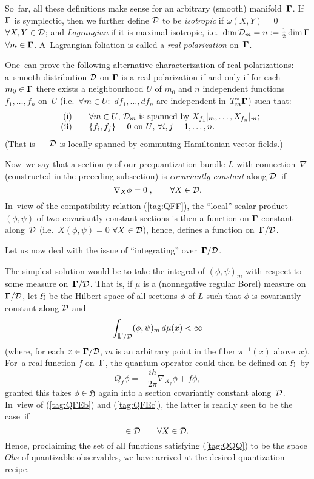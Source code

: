 \documentclass[11pt]{amsart}
\numberwithin{equation}{section}
\theoremstyle{remark}
\newcommand\Obs{Obs}
\newcommand\Omg{{\bigam}}   %
\newcommand\DD{{\Cal D}}
\newcommand\MD{{\Omg/\DD}}
\newcommand\HH{\mathfrak H}
\newcommand{\bigam}{\mbox{\boldmath $\Gamma$}}
\begin{document}
So~far, all these definitions make sense for an arbitrary (smooth)
manifold~$\Omg$. If~$\Omg$ is symplectic, then we further define $\DD$ to
be {\sl isotropic\/} if $\omega(X,Y)=0$ $\forall X,Y\in\DD$; and
{\sl Lagrangian\/} if it is maximal isotropic,
i.e.~$\dim\DD_m=n:=\frac12\dim \Omg$ $\forall m\in \Omg$.
A~Lagrangian foliation is called a {\sl real polarization\/} on~$\Omg$.

One~can prove the following alternative characterization of real polarizations:
a~smooth distribution $\DD$ on $\Omg$ is a real polarization if and only if for
each $m_0\in \Omg$ there exists a neighbourhood $U$ of $m_0$ and $n$
independent functions $f_1,\dots,f_n$ on~$U$ (i.e.~$\forall m\in U:$
$df_1,\dots,df_n$ are independent in~$T^*_m \Omg$) such that:
\begin{equation}  \begin{array}{rl}
\text{(i) }&\text{$\forall m\in U$, $\DD_m$ is spanned by $X_{f_1}|_m,\dots,
X_{f_n}|_m$;}\\
\text{(ii) }&\text{$\{f_i,f_j\}=0$ on $U$, $\forall i,j=1,\dots,n$.}
\end{array}  \label{tag:REALPOL}  \end{equation}
(That is --- $\DD$ is locally spanned by commuting Hamiltonian vector-fields.)

Now~we say that a section $\phi$ of our prequantization bundle $L$ with
connection~$\nabla$ (constructed in the preceding subsection) is {\sl
covariantly constant\/} along $\DD$~if
$$ \nabla_X \phi=0\; ,  \qquad \forall X\in \DD.  $$
In~view of the compatibility relation (\ref{tag:QFF}), the ``local'' scalar
product $(\phi,\psi)$ of two covariantly constant sections is then a function
on $\Omg$ constant along~$\DD$ (i.e.~$X(\phi,\psi)=0$ $\forall X\in\DD$),
hence, defines a function on~$\MD$.

Let us now deal with the issue of ``integrating'' over~$\MD$.

The simplest solution would be to take the integral of $(\phi,\psi)_m$ with
respect to some measure on~$\MD$. That is, if $\mu$ is a (nonnegative regular
Borel) measure on~$\MD$, let $\HH$ be the Hilbert space of all sections
$\phi$ of $L$ such that $\phi$ is covariantly constant along $\DD$ and
$$ \int_{\MD} (\phi,\psi)_m \, d\mu(x) <\infty  $$
(where, for each $x\in \MD$, $m$ is an arbitrary point in the fiber
$\pi^{-1}(x)$ above~$x$). For~a real function $f$ on~$\Omg$, the quantum
operator could then be defined on $\HH$~by
\begin{equation}  Q_f \phi = -\frac{ih}{2\pi} \nabla_{X_f} \phi + f\phi,
\label{tag:QPP}  \end{equation}
granted this takes $\phi\in\HH$ again into a section covariantly constant
along~$\DD$. In~view of (\ref{tag:QFEb}) and (\ref{tag:QFEc}), the latter is
readily seen to be the case~if
\begin{equation}  [X_f,X]\in\DD \qquad\forall X\in\DD.   \label{tag:QQQ}
\end{equation}
Hence, proclaiming the set of all functions satisfying (\ref{tag:QQQ}) to be
the space $\Obs$ of quantizable observables, we have arrived at the desired
quantization recipe.
\end{document}
